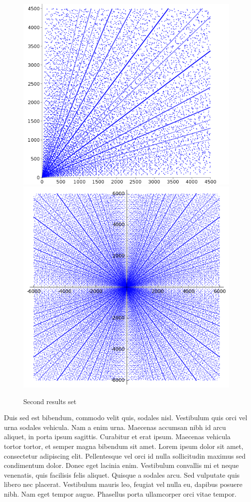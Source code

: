 \begin{figure}[!ht]
\centering
\includegraphics[scale = 0.3]{images/results_2}
\includegraphics[scale = 0.35]{images/results_3}
\caption{Second results set}
\end{figure}

Duis sed est bibendum, commodo velit quis, sodales nisl. Vestibulum quis orci vel urna sodales vehicula. Nam a enim urna. Maecenas accumsan nibh id arcu aliquet, in porta ipsum sagittis. Curabitur et erat ipsum. Maecenas vehicula tortor tortor, et semper magna bibendum sit amet. Lorem ipsum dolor sit amet, consectetur adipiscing elit. Pellentesque vel orci id nulla sollicitudin maximus sed condimentum dolor. Donec eget lacinia enim. Vestibulum convallis mi et neque venenatis, quis facilisis felis aliquet. Quisque a sodales arcu. Sed vulputate quis libero nec placerat. Vestibulum mauris leo, feugiat vel nulla eu, dapibus posuere nibh. Nam eget tempor augue. Phasellus porta ullamcorper orci vitae tempor.

